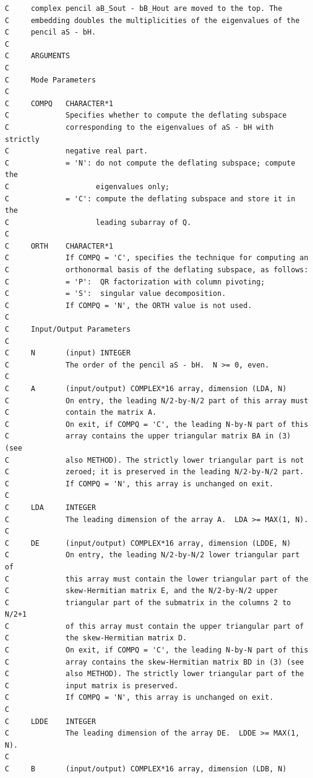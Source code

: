 \documentclass[a4paper,10pt]{article}
\begin{document}
\begin{verbatim}
C     complex pencil aB_Sout - bB_Hout are moved to the top. The
C     embedding doubles the multiplicities of the eigenvalues of the
C     pencil aS - bH.
C
C     ARGUMENTS
C
C     Mode Parameters
C
C     COMPQ   CHARACTER*1
C             Specifies whether to compute the deflating subspace
C             corresponding to the eigenvalues of aS - bH with strictly
C             negative real part.
C             = 'N': do not compute the deflating subspace; compute the
C                    eigenvalues only;
C             = 'C': compute the deflating subspace and store it in the
C                    leading subarray of Q.
C
C     ORTH    CHARACTER*1
C             If COMPQ = 'C', specifies the technique for computing an
C             orthonormal basis of the deflating subspace, as follows:
C             = 'P':  QR factorization with column pivoting;
C             = 'S':  singular value decomposition.
C             If COMPQ = 'N', the ORTH value is not used.
C
C     Input/Output Parameters
C
C     N       (input) INTEGER
C             The order of the pencil aS - bH.  N >= 0, even.
C
C     A       (input/output) COMPLEX*16 array, dimension (LDA, N)
C             On entry, the leading N/2-by-N/2 part of this array must
C             contain the matrix A.
C             On exit, if COMPQ = 'C', the leading N-by-N part of this
C             array contains the upper triangular matrix BA in (3) (see
C             also METHOD). The strictly lower triangular part is not
C             zeroed; it is preserved in the leading N/2-by-N/2 part.
C             If COMPQ = 'N', this array is unchanged on exit.
C
C     LDA     INTEGER
C             The leading dimension of the array A.  LDA >= MAX(1, N).
C
C     DE      (input/output) COMPLEX*16 array, dimension (LDDE, N)
C             On entry, the leading N/2-by-N/2 lower triangular part of
C             this array must contain the lower triangular part of the
C             skew-Hermitian matrix E, and the N/2-by-N/2 upper
C             triangular part of the submatrix in the columns 2 to N/2+1
C             of this array must contain the upper triangular part of
C             the skew-Hermitian matrix D.
C             On exit, if COMPQ = 'C', the leading N-by-N part of this
C             array contains the skew-Hermitian matrix BD in (3) (see
C             also METHOD). The strictly lower triangular part of the
C             input matrix is preserved.
C             If COMPQ = 'N', this array is unchanged on exit.
C
C     LDDE    INTEGER
C             The leading dimension of the array DE.  LDDE >= MAX(1, N).
C
C     B       (input/output) COMPLEX*16 array, dimension (LDB, N)

\end{verbatim}
\end{document}
